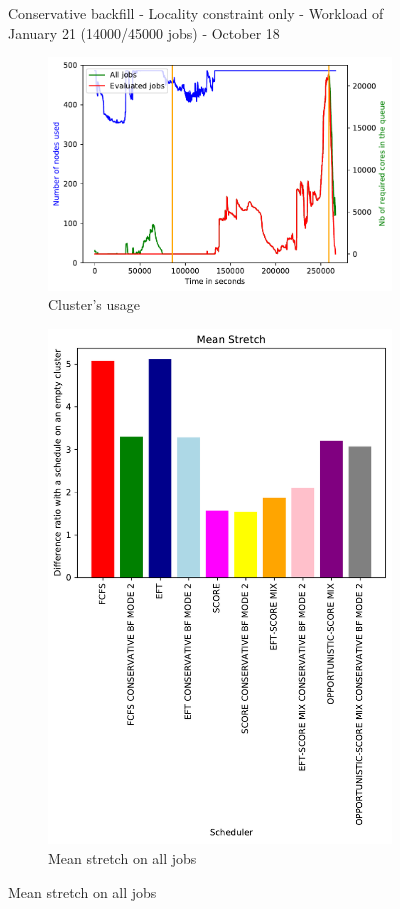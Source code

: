 \documentclass[a4paper]{article}
\begin{document}
\begin{figure}[H]
\caption{Conservative backfill - Locality constraint only - Workload of January 21 (14000/45000 jobs) - October 18}\end{figure}

\begin{figure}[H]\centering
\begin{subfigure}[b]{0.4\linewidth}\centering\includegraphics[width=1\linewidth]{MBSS/plot/2022-03-15->2022-03-16_V9271_Fcfs_Used_nodes_450_128_32_256_4_1024.pdf}\caption{Cluster's usage}\end{subfigure}
\begin{subfigure}[b]{0.4\linewidth}\centering\includegraphics[width=0.9\linewidth]{MBSS/plot/Results_FCFS_Score_Backfill_2022-03-15->2022-03-16_V9271_Mean_Stretch_450_128_32_256_4_1024.pdf}\caption{Mean stretch on all jobs}\end{subfigure}

\end{figure}
\end{document}
